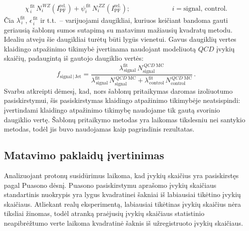 \documentclass[a4paper, 12pt, oneside]{article}
\newcommand{\ZZ}{Z\! Z}
\newcommand{\WZ}{W\! Z}
\newcommand{\QCD}{QC\! D}
\newlength\q
\begin{document}
\begin{enumerate}
\begin{equation}
\begin{gathered}
			\chi^{\,\mathrm{fit}}_{\,i}\, N^{\,\WZ}_{i}(I^{\mathrm{rel.}}_{\mathrm{PF}}) +
			\psi^{\,\mathrm{fit}}_{i}\, N^{\,\ZZ}_{i}(I^{\mathrm{rel.}}_{\mathrm{PF}});
			\hspace{74pt} i = \mathrm{signal}, \, \mathrm{control}.
		\end{gathered}
	\end{equation}
	Čia $\lambda^{\mathrm{fit}}_{\,i}$, $\epsilon^{\,\mathrm{fit}}_{\,i}$ ir t.t.\ -- varijuojami daugikliai,
	kuriuos keičiant bandoma gauti geriausią šablonų sumos sutapimą su matavimu mažiausių kvadratų metodu.
	Idealiu atveju šie daugikliai turėtų būti lygūs vienetui. 
	Gavus daugiklių vertes klaidingo atpažinimo tikimybė įvertinama naudojant modeliuotą $\QCD$ įvykių skaičių, padaugintą
	iš gautojo daugiklio vertės:
	\begin{equation}
		f_{\mathrm{signal} \,| \,\mathrm{Jet}} =
		\frac{\lambda^{\mathrm{fit}}_{\,\mathrm{signal}}\, N^{\,\QCD \; \mathrm{MC}}_{\mathrm{signal}}}
		{\lambda^{\mathrm{fit}}_{\,\mathrm{signal}}\, N^{\,\QCD \; \mathrm{MC}}_{\mathrm{signal}} +
		\lambda^{\mathrm{fit}}_{\,\mathrm{control}}\, N^{\,\QCD \; \mathrm{MC}}_{\mathrm{control}}}\, .
	\end{equation}
	Svarbu atkreipti dėmesį, kad, nors šablonų pritaikymas daromas izoliuotumo pasiskirstymui, šis pasiskirstymas klaidingo
	atpažinimo tikimybėje neatsispindi: įvertindami klaidingo atpažinimo tikimybę naudojame tik gautą svorinio daugiklio vertę.
	Šablonų pritaikymo metodas yra laikomas tikslesniu nei santykio metodas, todėl jis buvo naudojamas kaip pagrindinis rezultatas.
\end{enumerate}

\subsection{Matavimo paklaidų įvertinimas}\label{sec:uncertainties}
Analizuojant protonų susidūrimus laikoma, kad įvykių skaičius yra pasiskirstęs pagal Puasono dėsnį.
Puasono pasiskirstymu aprašomo įvykių skaičiaus standartinis nuokrypis yra lygus kvadratinei šakniai iš labiausiai
tikėtino įvykių skaičiaus.
Atliekant realų eksperimentą, labiausiai tikėtinas įvykių skaičius nėra tiksliai žinomas, todėl atranką praėjusių
įvykių skaičiaus statistinio neapibrėžtumo verte laikoma kvadratinė šaknis iš užregistruoto įvykių skaičiaus.
\end{document}
